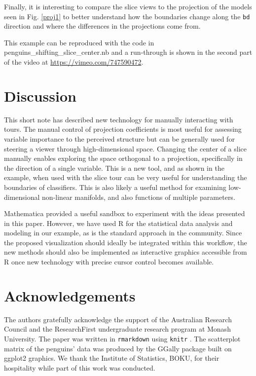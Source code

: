 \documentclass[]{interact}
\theoremstyle{plain}%
\theoremstyle{definition}
\theoremstyle{remark}
\begin{document}
Finally, it is interesting to compare the slice views to the projection
of the models seen in Fig. \ref{proj1} to better understand how the
boundaries change along the \texttt{bd} direction and where the
differences in the projections come from.

This example can be reproduced with the code in
penguins\_shifting\_slice\_center.nb and a run-through is shown in the
second part of the video at \url{https://vimeo.com/747590472}.

\hypertarget{sec:discussion}{%
\section{Discussion}\label{sec:discussion}}

This short note has described new technology for manually interacting
with tours. The manual control of projection coefficients is most useful
for assessing variable importance to the perceived structure but can be
generally used for steering a viewer through high-dimensional space.
Changing the center of a slice manually enables exploring the space
orthogonal to a projection, specifically in the direction of a single
variable. This is a new tool, and as shown in the example, when used
with the slice tour can be very useful for understanding the boundaries
of classifiers. This is also likely a useful method for examining
low-dimensional non-linear manifolds, and also functions of multiple
parameters.

Mathematica provided a useful sandbox to experiment with the ideas
presented in this paper. However, we have used R for the statistical
data analysis and modeling in our example, as is the standard approach
in the community. Since the proposed visualization should ideally be
integrated within this workflow, the new methods should also be
implemented as interactive graphics accessible from R once new
technology with precise cursor control becomes available.

\hypertarget{acknowledgements}{%
\section*{Acknowledgements}\label{acknowledgements}}

The authors gratefully acknowledge the support of the Australian
Research Council and the ResearchFirst undergraduate research program at
Monash University. The paper was written in \texttt{rmarkdown}
\citep{rmarkdown} using \texttt{knitr} \citep{knitr}. The scatterplot
matrix of the penguins' data was produced by the GGally \citep{GGally}
package built on ggplot2 \citep{ggplot2} graphics. We thank the
Institute of Statistics, BOKU, for their hospitality while part of this
work was conducted.
\end{document}
